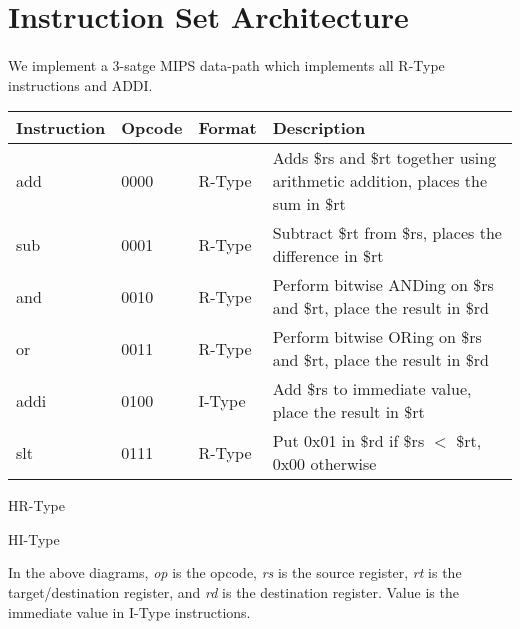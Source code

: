 \documentclass{article}
\newenvironment{problem}[1]{
  \nobreak\section*{#1}
}{}
\begin{document}
  \begin{problem}{Instruction Set Architecture}
    \paragraph{}
    We implement a 3-satge MIPS data-path which implements all R-Type instructions and ADDI.

    \begin{table}[]
      \begin{tabular}{@{}lllp{6.8cm}@{}}
        \toprule
        Instruction & Opcode & Format & Description \\ \midrule
        add & 0000 & R-Type & Adds \$rs and \$rt together using arithmetic addition, places the sum in \$rt \\
        sub & 0001 & R-Type & Subtract \$rt from \$rs, places the difference in \$rt \\
        and & 0010 & R-Type & Perform bitwise ANDing on \$rs and \$rt, place the result in \$rd \\
        or & 0011 & R-Type & Perform bitwise ORing on \$rs and \$rt, place the result in \$rd \\
        addi & 0100 & I-Type & Add \$rs to immediate value, place the result in \$rt \\
        slt & 0111 & R-Type & Put 0x01 in \$rd if \$rs $<$ \$rt, 0x00 otherwise \\ \bottomrule
      \end{tabular}
    \end{table}
    
    \begin{register}{H}{R-Type}{}
      \begin{center}
      \end{center}
    \end{register}

    \begin{register}{H}{I-Type}{}
      \begin{center}
      \end{center}
    \end{register}

    In the above diagrams, \emph{op} is the opcode, \emph{rs} is the
    source register, \emph{rt} is the target/destination register, and
    \emph{rd} is the destination register.  Value is the immediate value
    in I-Type instructions.
  \end{problem}
\end{document}
